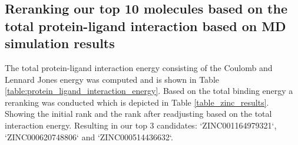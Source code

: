 \documentclass[11pt, letterpaper, titlepage]{article}
\begin{document}
 

\subsection{Reranking our top 10 molecules based on the total protein-ligand interaction based on MD simulation results} 

 

The total protein-ligand interaction energy consisting of the Coulomb and Lennard Jones energy was computed and is shown in Table \ref{table:protein_ligand_interaction_energy}. Based on the total binding energy a reranking was conducted which is depicted in Table \ref{table_zinc_results}. Showing the initial rank and the rank after readjusting based on the total interaction energy. Resulting in our top 3 candidates: `ZINC001164979321`, `ZINC000620748806` and `ZINC000514436632`. 

 
\end{document}
